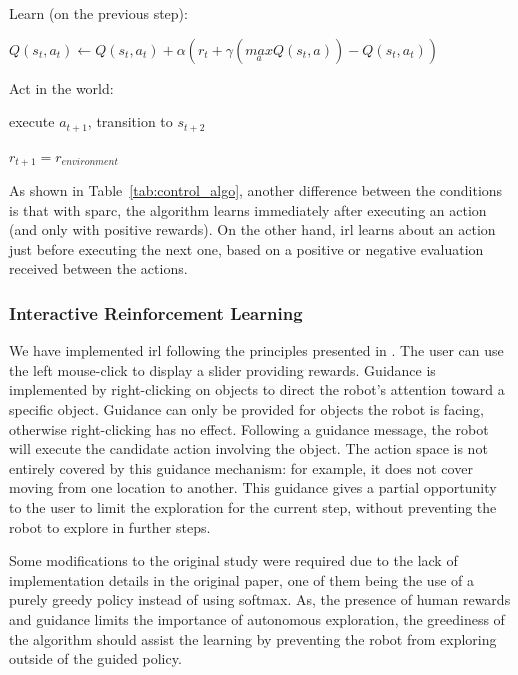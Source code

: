 \begin{table}
\begin{minipage}[t]{0.5\textwidth}
\begin{algorithm}[H]
\begin{minipage}{0.9\linewidth}
{		\nosemic Learn (on the previous step):
		 
		\pushline\dosemic$Q(s_{t},a_{t}) \leftarrow Q(s_{t},a_{t}) + \alpha (r_{t}+\gamma (\underset{a}{max} Q(s_{t},a))-Q(s_{t},a_{t}))$
		
		\popline \nosemic Act in the world:
		
		\pushline\dosemic execute $a_{t+1}$, transition to $s_{t+2}$
		
		\popline$r_{t+1} = r_{environment}$
	}
	\end{minipage}
	\end{algorithm}
\end{minipage}
\label{tab:control_algo}
\end{table}

As shown in Table~\ref{tab:control_algo}, another difference between the conditions is that with \gls{sparc}, the algorithm learns immediately after executing an action (and only with positive rewards). On the other hand, \gls{irl} learns about an action just before executing the next one, based on a positive or negative evaluation received between the actions.

\subsubsection{Interactive Reinforcement Learning}

We have implemented \gls{irl} following the principles presented in \cite{thomaz2008teachable}. The user can use the left mouse-click to display a slider providing rewards. Guidance is implemented by right-clicking on objects to direct the robot's attention toward a specific object. Guidance can only be provided for objects the robot is facing, otherwise right-clicking has no effect. Following a guidance message, the robot will execute the candidate action involving the object. The action space is not entirely covered by this guidance mechanism: for example, it does not cover moving from one location to another. This guidance gives a partial opportunity to the user to limit the exploration for the current step, without preventing the robot to explore in further steps.

Some modifications to the original study were required due to the lack of implementation details in the original paper, one of them being the use of a purely greedy policy instead of using softmax. As, the presence of human rewards and guidance limits the importance of autonomous exploration, the greediness of the algorithm should assist the learning by preventing the robot from exploring outside of the guided policy. 

